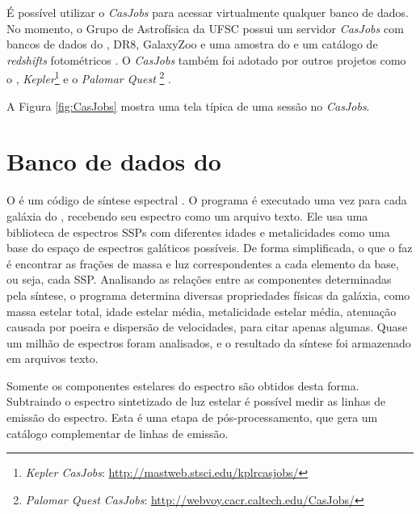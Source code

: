 É possível utilizar o {\em CasJobs} para acessar virtualmente qualquer banco de
dados. No momento, o Grupo de Astrofísica da UFSC possui um servidor {\em
CasJobs} com bancos de dados do \starlight, \SDSS DR8, GalaxyZoo
\citep{Lintott2008} e uma amostra do \galex e um catálogo de {\em redshifts}
fotométricos \citep{OMill2011}. O {\em CasJobs} também foi adotado por outros
projetos como o \galex, {\em Kepler}\footnote{{\em Kepler CasJobs}:
\url{http://mastweb.stsci.edu/kplrcasjobs/}} e o {\em Palomar Quest
}\footnote{{\em Palomar Quest CasJobs}:
\url{http://webvoy.cacr.caltech.edu/CasJobs/}} \citep{Djorgovski2008}.

A Figura \ref{fig:CasJobs} mostra uma tela típica de uma sessão no {\em
CasJobs}.



\section{Banco de dados do \STARLIGHT}

O \starlight é um código de síntese espectral \citep{CidFernandes2005}. O
programa é executado uma vez para cada galáxia do \SDSS, recebendo seu espectro
como um arquivo texto. Ele usa uma biblioteca de espectros SSPs com diferentes
idades e metalicidades como uma base do espaço de espectros galáticos possíveis.
De forma simplificada, o que o \starlight faz é encontrar as frações de massa e
luz correspondentes a cada elemento da base, ou seja, cada SSP. Analisando as
relações entre as componentes determinadas pela síntese, o programa determina
diversas propriedades físicas da galáxia, como massa estelar total, idade
estelar média, metalicidade estelar média, atenuação causada por poeira e
dispersão de velocidades, para citar apenas algumas. Quase um milhão de
espectros foram analisados, e o resultado da síntese foi armazenado em arquivos
texto.

Somente os componentes estelares do espectro são obtidos desta forma. Subtraindo
o espectro sintetizado de luz estelar é possível medir as linhas de emissão do
espectro. Esta é uma etapa de pós-processamento, que gera um catálogo
complementar de linhas de emissão.

